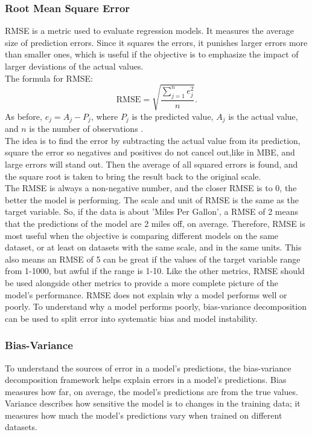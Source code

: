 \newpage

\subsubsection{Root Mean Square Error}   

RMSE is a metric used to evaluate regression models. It measures the average size of prediction errors. Since it squares the errors, it punishes larger errors more than smaller ones, which is useful if the objective is to emphasize the impact of larger deviations of the actual values.
\\
The formula for RMSE:
\begin{equation}
	\text{RMSE}=\sqrt{\frac{ \sum_{j=1}^{n} e_j^2 }{n}}.
\end{equation}
As before, $e_{j}=A_{j}-P_{j}$, where $P_{j}$ is the predicted value, $A_{j}$ is the actual value, and $n$ is the number of observations \cite{metrics}.
\\ The idea is to find the error by subtracting the actual value from its prediction, square the error so negatives and positives do not cancel out,like in MBE, and large errors will stand out. Then the average of all squared errors is found, and the square root is taken to bring the result back to the original scale. 
\\

\noindent The RMSE is always a non-negative number, and the closer RMSE is to 0, the better the model is performing. The scale and unit of RMSE is the same as the target variable. So, if the data is about 'Miles Per Gallon', a RMSE of 2 means that the predictions of the model are 2 miles off, on average. Therefore, RMSE is most useful when the objective is comparing different models on the same dataset, or at least on datasets with the same scale, and in the same units. This also means an RMSE of 5 can be great if the values of the target variable range from 1-1000, but awful if the range is 1-10. Like the other metrics, RMSE should be used alongside other metrics to provide a more complete picture of the model’s performance. RMSE does not explain why a model performs well or poorly. To understand why a model performs poorly, bias-variance decomposition can be used to split error into systematic bias and model instability.
\newpage

\subsubsection{Bias-Variance}
To understand the sources of error in a model’s predictions, the bias-variance decomposition framework helps explain errors in a model’s predictions. Bias measures how far, on average, the model's predictions are from the true values. Variance describes how sensitive the model is to changes in the training data; it measures how much the model’s predictions vary when trained on different datasets. \newline 

